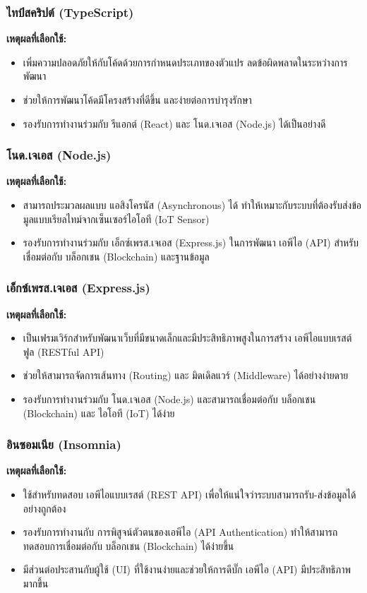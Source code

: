 \subsubsection{ไทป์สคริปต์ (TypeScript)}
\textbf{เหตุผลที่เลือกใช้:}
\begin{itemize}
    \item เพิ่มความปลอดภัยให้กับโค้ดด้วยการกำหนดประเภทของตัวแปร ลดข้อผิดพลาดในระหว่างการพัฒนา
    \item ช่วยให้การพัฒนาโค้ดมีโครงสร้างที่ดีขึ้น และง่ายต่อการบำรุงรักษา
    \item รองรับการทำงานร่วมกับ รีแอกต์ (React) และ โนด.เจเอส (Node.js) ได้เป็นอย่างดี
\end{itemize}

\subsubsection{โนด.เจเอส (Node.js)}
\textbf{เหตุผลที่เลือกใช้:}
\begin{itemize}
    \item สามารถประมวลผลแบบ แอสิงโครนัส (Asynchronous) ได้ ทำให้เหมาะกับระบบที่ต้องรับส่งข้อมูลแบบเรียลไทม์จากเซ็นเซอร์ไอโอที (IoT Sensor)
    \item รองรับการทำงานร่วมกับ เอ็กซ์เพรส.เจเอส (Express.js) ในการพัฒนา เอพีไอ (API) สำหรับเชื่อมต่อกับ บล็อกเชน (Blockchain) และฐานข้อมูล
\end{itemize}
\subsubsection{เอ็กซ์เพรส.เจเอส (Express.js)}
\textbf{เหตุผลที่เลือกใช้:}
\begin{itemize}
    \item เป็นเฟรมเวิร์กสำหรับพัฒนาเว็บที่มีขนาดเล็กและมีประสิทธิภาพสูงในการสร้าง เอพีไอแบบเรสต์ฟูล (RESTful API)
    \item ช่วยให้สามารถจัดการเส้นทาง (Routing) และ มิดเดิลแวร์ (Middleware) ได้อย่างง่ายดาย
    \item รองรับการทำงานร่วมกับ โนด.เจเอส (Node.js) และสามารถเชื่อมต่อกับ บล็อกเชน (Blockchain) และ ไอโอที (IoT) ได้ง่าย
\end{itemize}

\subsubsection{อินซอมเนีย (Insomnia)}
\sloppy
\textbf{เหตุผลที่เลือกใช้:}
\begin{itemize}
    \item ใช้สำหรับทดสอบ เอพีไอแบบเรสต์ (REST API) เพื่อให้แน่ใจว่าระบบสามารถรับ-ส่งข้อมูลได้อย่างถูกต้อง
    \item รองรับการทำงานกับ การพิสูจน์ตัวตนของเอพีไอ (API Authentication) ทำให้สามารถทดสอบการเชื่อมต่อกับ บล็อกเชน (Blockchain) ได้ง่ายขึ้น
    \item มีส่วนต่อประสานกับผู้ใช้ (UI) ที่ใช้งานง่ายและช่วยให้การดีบั๊ก เอพีไอ (API) มีประสิทธิภาพมากขึ้น
\end{itemize}

